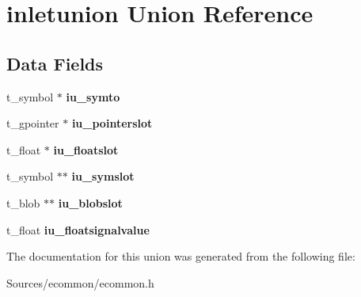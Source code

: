 \hypertarget{unioninletunion}{\section{inletunion Union Reference}
\label{unioninletunion}
}
\subsection*{Data Fields}
\begin{DoxyCompactItemize}
\item 
\hypertarget{unioninletunion_a034ef76c9ac47aad410c151b1a3072ed}{t\-\_\-symbol $\ast$ {\bfseries iu\-\_\-symto}}\label{unioninletunion_a034ef76c9ac47aad410c151b1a3072ed}

\item 
\hypertarget{unioninletunion_a765f6acce4359fbeaebd130279fdd899}{t\-\_\-gpointer $\ast$ {\bfseries iu\-\_\-pointerslot}}\label{unioninletunion_a765f6acce4359fbeaebd130279fdd899}

\item 
\hypertarget{unioninletunion_a4ea31644c26b1c46f9541353b293d3f6}{t\-\_\-float $\ast$ {\bfseries iu\-\_\-floatslot}}\label{unioninletunion_a4ea31644c26b1c46f9541353b293d3f6}

\item 
\hypertarget{unioninletunion_a347eb160d2e6d55719beabdae51a2ac9}{t\-\_\-symbol $\ast$$\ast$ {\bfseries iu\-\_\-symslot}}\label{unioninletunion_a347eb160d2e6d55719beabdae51a2ac9}

\item 
\hypertarget{unioninletunion_aa5bed621c07aa6838a05e81384933715}{t\-\_\-blob $\ast$$\ast$ {\bfseries iu\-\_\-blobslot}}\label{unioninletunion_aa5bed621c07aa6838a05e81384933715}

\item 
\hypertarget{unioninletunion_a4b62c62214438358765fee52d88ac7c5}{t\-\_\-float {\bfseries iu\-\_\-floatsignalvalue}}\label{unioninletunion_a4b62c62214438358765fee52d88ac7c5}

\end{DoxyCompactItemize}


The documentation for this union was generated from the following file\-:\begin{DoxyCompactItemize}
\item 
Sources/ecommon/ecommon.\-h\end{DoxyCompactItemize}
